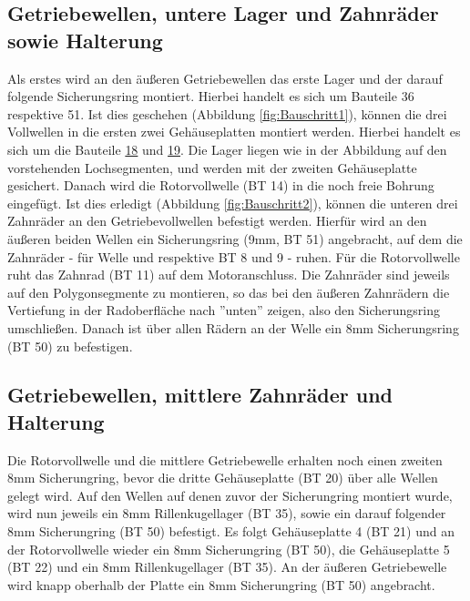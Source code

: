 \documentclass[10pt, a4paper]{article}
\newcommand*{\rom}[1]{\expandafter\uppercase\expandafter{\romannumeral #1 \relax}}
\begin{document}
\subsection{Getriebewellen, untere Lager und Zahnräder sowie Halterung}
Als erstes wird an den äußeren Getriebewellen das erste Lager und der darauf folgende Sicherungsring montiert. Hierbei handelt es sich um Bauteile 36 respektive 51. Ist dies geschehen (Abbildung \ref{fig:Bauschritt1}), können die drei Vollwellen in die ersten zwei Gehäuseplatten montiert werden. Hierbei handelt es sich um die Bauteile \hyperlink{list_Platte1}{18} und \hyperlink{list_Platte1}{19}. Die Lager liegen wie in der Abbildung auf den vorstehenden Lochsegmenten, und werden mit der zweiten Gehäuseplatte gesichert. Danach wird die Rotorvollwelle (BT 14) in die noch freie Bohrung eingefügt. Ist dies erledigt (Abbildung \ref{fig:Bauschritt2}), können die unteren drei Zahnräder an den Getriebevollwellen befestigt werden. Hierfür wird an den äußeren beiden Wellen ein Sicherungsring (9mm, BT 51) angebracht, auf dem die Zahnräder - für Welle \rom{1} und \rom{2} respektive BT 8 und 9 - ruhen. Für die Rotorvollwelle ruht das Zahnrad (BT 11) auf dem Motoranschluss. Die Zahnräder sind jeweils auf den Polygonsegmente zu montieren, so das bei den äußeren Zahnrädern die Vertiefung in der Radoberfläche nach ''unten'' zeigen, also den Sicherungsring umschließen. Danach ist über allen Rädern an der Welle ein 8mm Sicherungsring (BT 50) zu befestigen.
\subsection{Getriebewellen, mittlere Zahnräder und \allowbreak Halterung}
Die Rotorvollwelle und die mittlere Getriebewelle erhalten noch einen zweiten 8mm Sicherungring, bevor die dritte Gehäuseplatte (BT 20) über alle Wellen gelegt wird. Auf den Wellen auf denen zuvor der Sicherungring montiert wurde, wird nun jeweils ein 8mm Rillenkugellager (BT 35), sowie ein darauf folgender 8mm Sicherungring (BT 50) befestigt. Es folgt Gehäuseplatte 4 (BT 21) und an der Rotorvollwelle wieder ein 8mm Sicherungring (BT 50), die Gehäuseplatte 5 (BT 22) und ein 8mm Rillenkugellager (BT 35). An der äußeren Getriebewelle wird knapp oberhalb der Platte ein 8mm Sicherungring (BT 50) angebracht.
\end{document}
